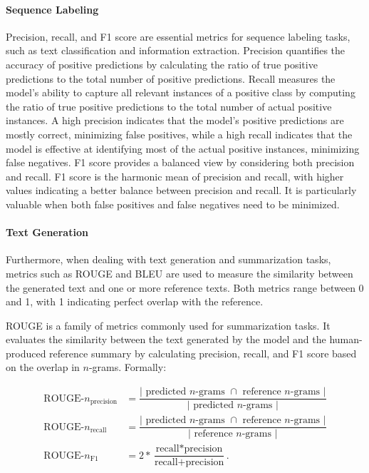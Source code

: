 \paragraph{Sequence Labeling} Precision, recall, and F1 score are essential metrics for sequence labeling tasks, such as text classification and information extraction. Precision quantifies the accuracy of positive predictions by calculating the ratio of true positive predictions to the total number of positive predictions. Recall measures the model's ability to capture all relevant instances of a positive class by computing the ratio of true positive predictions to the total number of actual positive instances. A high precision indicates that the model's positive predictions are mostly correct, minimizing false positives, while a high recall indicates that the model is effective at identifying most of the actual positive instances, minimizing false negatives. F1 score provides a balanced view by considering both precision and recall. F1 score is the harmonic mean of precision and recall, with higher values indicating a better balance between precision and recall. It is particularly valuable when both false positives and false negatives need to be minimized.

\paragraph{Text Generation} Furthermore, when dealing with text generation and summarization tasks, metrics such as \ac{ROUGE} \citep{lin2004rouge} and \ac{BLEU} \citep{papineni2002bleu} are used to measure the similarity between the generated text and one or more reference texts. Both metrics range between 0 and 1, with 1 indicating perfect overlap with the reference.

\ac{ROUGE} is a family of metrics commonly used for summarization tasks. It evaluates the similarity between the text generated by the model and the human-produced reference summary by calculating precision, recall, and F1 score based on the overlap in $n$-grams. Formally:

\begin{equation}
\begin{aligned}
    \text{ROUGE-}n_{\text{precision}} &= \dfrac{\vert \text{ predicted } n\text{-grams } \cap \text{ reference } n\text{-grams } \vert}{\vert \text{ predicted } n\text{-grams } \vert} \\
    \text{ROUGE-}n_{\text{recall}} &= \dfrac{\vert \text{ predicted } n\text{-grams } \cap \text{ reference } n\text{-grams } \vert}{\vert \text{ reference } n\text{-grams } \vert} \\
    \text{ROUGE-}n_{\text{F1}} &= 2 * \dfrac{\text{recall} * \text{precision}}{\text{recall} + \text{precision}}. \\
\end{aligned}
\end{equation}

